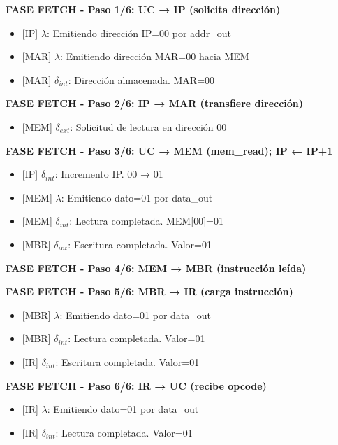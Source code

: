 \documentclass[12pt,oneside]{templates/unerthesis}
\providecommand{\tightlist}{%
  \setlength{\itemsep}{0pt}\setlength{\parskip}{0pt}}
\begin{document}
\textbf{FASE FETCH - Paso 1/6: UC → IP (solicita dirección)}

\begin{itemize}
\item
  {[}IP{]} \(\lambda\): Emitiendo dirección IP=00 por addr\_out
\item
  {[}MAR{]} \(\lambda\): Emitiendo dirección MAR=00 hacia MEM
\item
  {[}MAR{]} \(\delta_{int}\): Dirección almacenada. MAR=00
\end{itemize}

\textbf{FASE FETCH - Paso 2/6: IP → MAR (transfiere dirección)}

\begin{itemize}
\tightlist
\item
  {[}MEM{]} \(\delta_{ext}\): Solicitud de lectura en dirección 00
\end{itemize}

\textbf{FASE FETCH - Paso 3/6: UC → MEM (mem\_read); IP ← IP+1}

\begin{itemize}
\item
  {[}IP{]} \(\delta_{int}\): Incremento IP. 00 → 01
\item
  {[}MEM{]} \(\lambda\): Emitiendo dato=01 por data\_out
\item
  {[}MEM{]} \(\delta_{int}\): Lectura completada. MEM{[}00{]}=01
\item
  {[}MBR{]} \(\delta_{int}\): Escritura completada. Valor=01
\end{itemize}

\textbf{FASE FETCH - Paso 4/6: MEM → MBR (instrucción leída)}

\textbf{FASE FETCH - Paso 5/6: MBR → IR (carga instrucción)}

\begin{itemize}
\item
  {[}MBR{]} \(\lambda\): Emitiendo dato=01 por data\_out
\item
  {[}MBR{]} \(\delta_{int}\): Lectura completada. Valor=01
\item
  {[}IR{]} \(\delta_{int}\): Escritura completada. Valor=01
\end{itemize}

\textbf{FASE FETCH - Paso 6/6: IR → UC (recibe opcode)}

\begin{itemize}
\item
  {[}IR{]} \(\lambda\): Emitiendo dato=01 por data\_out
\item
  {[}IR{]} \(\delta_{int}\): Lectura completada. Valor=01
\end{itemize}
\end{document}
